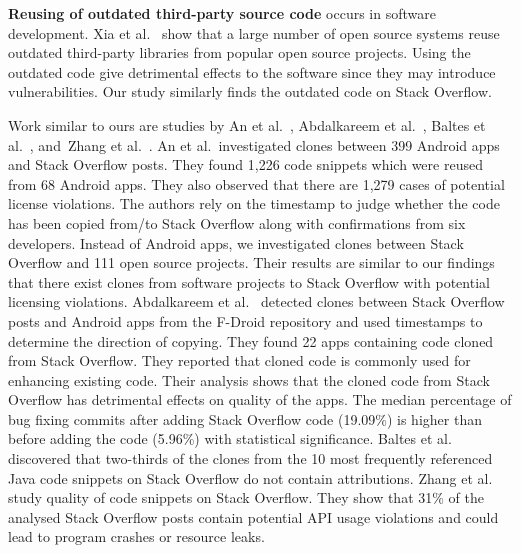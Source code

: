 \documentclass[10pt,journal,compsoc]{IEEEtran}
\begin{document}
\textbf{Reusing of outdated third-party source code} occurs 
in software development. Xia et al.~\cite{Xia2014} show that 
a large number of open source systems reuse outdated third-party 
libraries from popular open source projects. Using the outdated 
code give detrimental effects to the software since they may 
introduce vulnerabilities. Our study similarly finds the
outdated code on Stack Overflow.

Work similar to ours are studies by An et al.~\cite{An2017},
Abdalkareem et al.~\cite{Abdalkareem2017}, Baltes et al.~\cite{Baltes2017},
and~Zhang et al.~\cite{Zhang2018}. 
An et al.~investigated clones
between 399 Android apps and Stack Overflow posts. They found 1,226 code
snippets which were reused from 68 Android apps. They also observed that there
are 1,279 cases of potential license violations. The authors rely on the
timestamp to judge whether the code has been copied from/to Stack Overflow along
with confirmations from six developers. Instead of Android apps, we investigated
clones between Stack Overflow and 111 open source projects. Their results are
similar to our findings that there exist clones from software projects to Stack
Overflow with potential licensing violations. Abdalkareem et
al.~\cite{Abdalkareem2017} detected clones between Stack Overflow posts and
Android apps from the F-Droid repository and used timestamps to
determine the direction
of copying. They found 22 apps containing code cloned from Stack Overflow. They
reported that cloned code is commonly used for enhancing existing code. Their
analysis shows that the cloned code from Stack Overflow has detrimental effects on
quality of the apps. The median percentage of bug fixing commits after adding
Stack Overflow code (19.09\%) is higher than before adding the code (5.96\%)
with statistical significance.
Baltes et al.~\cite{Baltes2017} discovered that two-thirds of the clones 
from the 10 most frequently referenced Java code snippets on Stack
Overflow do not contain attributions.
Zhang et al.~\cite{Zhang2018} study quality of code snippets on
Stack Overflow.
They show that 31\% of the analysed Stack Overflow posts
contain potential API usage violations and could lead to program
crashes or resource leaks.
\end{document}
